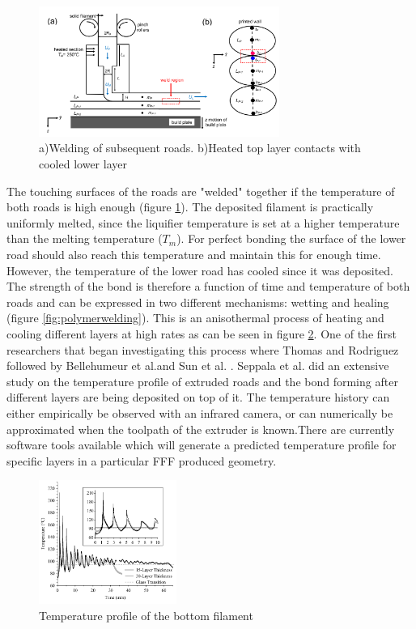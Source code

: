 \begin{figure}[H]
    \centering
    \includegraphics[width=0.7\textwidth]{chapter_2/figures/welding.png}
    \caption{a)Welding of subsequent roads. b)Heated top layer contacts with cooled lower layer \cite{McIlroy2016DeformationManufacturing}
    \label{fig:welding}}
\end{figure}

The touching surfaces of the roads are "welded" together if the temperature of both roads is high enough (figure \ref{fig:welding}). The deposited filament is practically uniformly melted, since the liquifier temperature is set at a higher temperature than the melting temperature ($T_m$). For perfect bonding the surface of the lower road should also reach this temperature and maintain this for enough time. However, the temperature of the lower road has cooled since it was deposited. The strength of the bond is therefore a function of time and temperature of both roads and can be expressed in two different mechanisms: wetting and healing (figure \ref{fig:polymerwelding}). This is an anisothermal process of heating and cooling different layers at high rates as can be seen in figure \ref{fig:temperaturehistory}. One of the first researchers that began investigating this process where Thomas and Rodriguez \cite{ThomasMODELINGROADS} followed by Bellehumeur et al.\cite{Bellehumeur2004ModelingProcess}and  Sun et al. \cite{Sun2008}. Seppala et al. \cite{Seppala2017WeldManufacturing} did an extensive study on the temperature profile of extruded roads and the bond forming after different layers are being deposited on top of it. The temperature history can either empirically be observed with an infrared camera, or can numerically be approximated when the toolpath of the extruder is known.There are currently software tools available which will generate a predicted temperature profile for specific layers in a particular FFF produced geometry\cite{Digimat-AM}. 

\begin{figure}[H]
    \centering
    \includegraphics[width=0.4\textwidth]{chapter_2/figures/temperaturehistory.PNG}
    \caption{Temperature profile of the bottom filament \cite{Sun2008}
    \label{fig:temperaturehistory}}
\end{figure}

